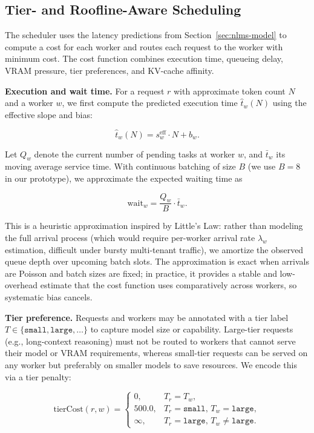 \documentclass[10pt,twocolumn,letterpaper]{article}
\begin{document}
\subsection{Tier- and Roofline-Aware Scheduling}
\label{sec:scheduling}

The scheduler uses the latency predictions from Section~\ref{sec:nlms-model} to compute a cost for each worker and routes each request to the worker with minimum cost. The cost function combines execution time, queueing delay, VRAM pressure, tier preferences, and KV-cache affinity.

\noindent \textbf{Execution and wait time.}
For a request $r$ with approximate token count $N$ and a worker $w$, we first compute the predicted execution time $\hat{t}_w(N)$ using the effective slope and bias:

\begin{equation}
\hat{t}_w(N) = s^{\text{eff}}_w \cdot N + b_w.
\end{equation}

Let $Q_w$ denote the current number of pending tasks at worker $w$, and $\bar{t}_w$ its moving average service time. With continuous batching of size $B$ (we use $B=8$ in our prototype), we approximate the expected waiting time as

\begin{equation}
\text{wait}_w = \frac{Q_w}{B} \cdot \bar{t}_w.
\end{equation}

This is a heuristic approximation inspired by Little's Law: rather than modeling the full arrival process (which would require per-worker arrival rate $\lambda_w$ estimation, difficult under bursty multi-tenant traffic), we amortize the observed queue depth over upcoming batch slots. The approximation is exact when arrivals are Poisson and batch sizes are fixed; in practice, it provides a stable and low-overhead estimate that the cost function uses comparatively across workers, so systematic bias cancels.

\noindent \textbf{Tier preference.}
Requests and workers may be annotated with a tier label $T \in \{\texttt{small}, \texttt{large}, \ldots\}$ to capture model size or capability. Large-tier requests (e.g., long-context reasoning) must not be routed to workers that cannot serve their model or VRAM requirements, whereas small-tier requests can be served on any worker but preferably on smaller models to save resources. We encode this via a tier penalty:

\begin{equation}
\text{tierCost}(r,w) =
\begin{cases}
0,      & T_r = T_w, \\
500.0,  & T_r = \texttt{small},\, T_w = \texttt{large}, \\
\infty, & T_r = \texttt{large},\, T_w \neq \texttt{large}.
\end{cases}
\end{equation}
\end{document}
